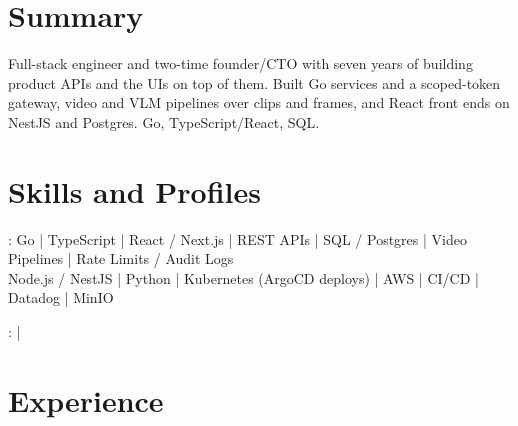 \documentclass[print]{jack-resume}
\begin{document}
\pagecolor{darkmodeBackground}


\begin{minipage}[t][1cm][t]{.03\textwidth}
    \hfill
\end{minipage}

\section{Summary}
Full-stack engineer and two-time founder/CTO with seven years of building product APIs and the UIs on top of them. Built Go services and a scoped-token gateway, video and VLM pipelines over clips and frames, and React front ends on NestJS and Postgres. Go, TypeScript/React, SQL.
\sectionsep

\section{Skills and Profiles}
:
Go \hfill | \hfill
TypeScript \hfill | \hfill
React / Next.js \hfill | \hfill
REST APIs \hfill | \hfill
SQL / Postgres \hfill | \hfill
Video Pipelines \hfill | \hfill
Rate Limits / Audit Logs \\
\hspace{1.0cm} Node.js / NestJS \hfill | \hfill
Python \hfill | \hfill
Kubernetes (ArgoCD deploys) \hfill | \hfill
AWS \hfill | \hfill
CI/CD \hfill | \hfill
Datadog \hfill | \hfill
MinIO \\

\raggedright{
    :
      \href{https://www.linkedin.com/in/jack-sturtevant/}{ \ExternalLink} |
     \href{https://github.com/jacksturt}{ \ExternalLink}}

\section{Experience}
\end{document}
